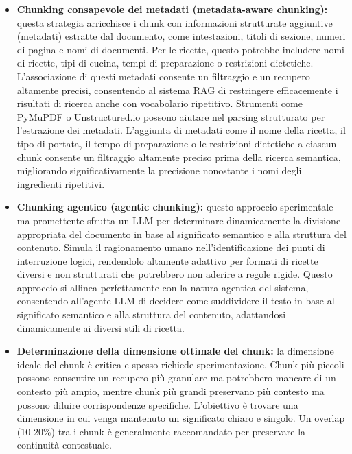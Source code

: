 \documentclass[a4paper, 11pt]{article}
\begin{document}
\begin{itemize}
    \item \textbf{Chunking consapevole dei metadati (metadata-aware chunking):} questa strategia arricchisce i chunk con informazioni strutturate aggiuntive (metadati) estratte dal documento, come intestazioni, titoli di sezione, numeri di pagina e nomi di documenti. \cite{semantic_chunking_multimodal} Per le ricette, questo potrebbe includere nomi di ricette, tipi di cucina, tempi di preparazione o restrizioni dietetiche. L'associazione di questi metadati consente un filtraggio e un recupero altamente precisi, consentendo al sistema RAG di restringere efficacemente i risultati di ricerca anche con vocabolario ripetitivo. \cite{metadata_aware_chunking_asimsultan} Strumenti come PyMuPDF o Unstructured.io possono aiutare nel parsing strutturato per l'estrazione dei metadati. \cite{metadata_aware_chunking_asimsultan} L'aggiunta di metadati come il nome della ricetta, il tipo di portata, il tempo di preparazione o le restrizioni dietetiche \cite{ai_recipe_generator} a ciascun chunk consente un filtraggio altamente preciso prima della ricerca semantica, migliorando significativamente la precisione nonostante i nomi degli ingredienti ripetitivi.
    \item \textbf{Chunking agentico (agentic chunking):} questo approccio sperimentale ma promettente sfrutta un LLM per determinare dinamicamente la divisione appropriata del documento in base al significato semantico e alla struttura del contenuto. \cite{chunking_strategies_ibm} Simula il ragionamento umano nell'identificazione dei punti di interruzione logici, rendendolo altamente adattivo per formati di ricette diversi e non strutturati che potrebbero non aderire a regole rigide. \cite{chunking_strategies_ibm} Questo approccio si allinea perfettamente con la natura agentica del sistema, consentendo all'agente LLM di decidere come suddividere il testo in base al significato semantico e alla struttura del contenuto, adattandosi dinamicamente ai diversi stili di ricetta.
    \item \textbf{Determinazione della dimensione ottimale del chunk:} la dimensione ideale del chunk è critica e spesso richiede sperimentazione. \cite{chunking_strategies_ibm} Chunk più piccoli possono consentire un recupero più granulare ma potrebbero mancare di un contesto più ampio, mentre chunk più grandi preservano più contesto ma possono diluire corrispondenze specifiche. \cite{enhancing_rag_ibm} L'obiettivo è trovare una dimensione in cui venga mantenuto un significato chiaro e singolo. \cite{semantic_chunking_multimodal} Un overlap (10-20\%) tra i chunk è generalmente raccomandato per preservare la continuità contestuale. \cite{semantic_chunking_multimodal}
\end{itemize}
\end{document}

